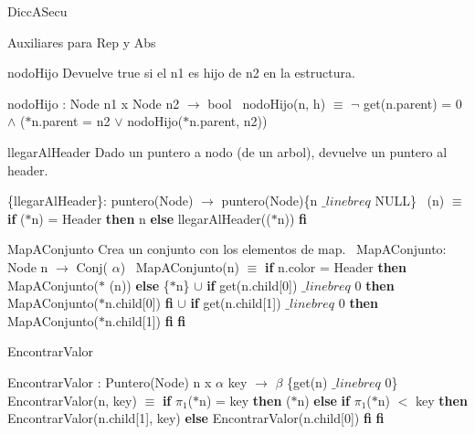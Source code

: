 \begin{DoxyParagraph}{\-Dicc\-A\-Secu}
\begin{DoxyVerb}Auxiliares para Rep y Abs
\end{DoxyVerb}


\begin{DoxyParagraph}{nodo\+Hijo}
Devuelve true si el n1 es hijo de n2 en la estructura.

nodo\+Hijo \+: Node n1 x Node n2 $\to$ bool~\newline
nodo\+Hijo(n, h) $\equiv$ $\lnot$ get(n.\+parent) = 0 $\land$ ($\ast$n.parent = n2 $\lor$ nodo\+Hijo($\ast$n.parent, n2)) 
\end{DoxyParagraph}


\begin{DoxyParagraph}{llegar\+Al\+Header}
Dado un puntero a nodo (de un arbol), devuelve un puntero al header.

\{llegar\+Al\+Header\}\+: puntero(\+Node) $\to$ puntero(\+Node)\{n $\_linebr eq$ N\+U\+LL\}~\newline
(n) $\equiv$ {\bfseries if} ($\ast$n) = Header {\bfseries then} n {\bfseries else} llegar\+Al\+Header(($\ast$n)) {\bfseries fi} 


\end{DoxyParagraph}
\begin{DoxyParagraph}{Map\+A\+Conjunto}
Crea un conjunto con los elementos de map.~\newline
 Map\+A\+Conjunto\+: Node n $\to$ Conj( $\alpha$)~\newline
Map\+A\+Conjunto(n) $\equiv$ {\bfseries if} n.\+color = Header {\bfseries then} Map\+A\+Conjunto($\ast$ (n)) {\bfseries else} \{$\ast$n\} $\cup$ {\bfseries if} get(n.\+child\mbox{[}0\mbox{]}) $\_linebr eq$ 0 {\bfseries then} Map\+A\+Conjunto($\ast$n.child\mbox{[}0\mbox{]}) {\bfseries fi} $\cup$ {\bfseries if} get(n.\+child\mbox{[}1\mbox{]}) $\_linebr eq$ 0 {\bfseries then} Map\+A\+Conjunto($\ast$n.child\mbox{[}1\mbox{]}) {\bfseries fi} {\bfseries fi} 
\end{DoxyParagraph}


\begin{DoxyParagraph}{Encontrar\+Valor}


Encontrar\+Valor \+: Puntero(\+Node) n x $\alpha$ key $\to$ $\beta$ \{get(n) $\_linebr eq$ 0\}~\newline
Encontrar\+Valor(n, key) $\equiv$ {\bfseries if} $\pi_1$($\ast$n) = key {\bfseries then} ($\ast$n) {\bfseries else} {\bfseries if} $\pi_1$($\ast$n) $<$ key {\bfseries then} Encontrar\+Valor(n.\+child\mbox{[}1\mbox{]}, key) {\bfseries else} Encontrar\+Valor(n.\+child\mbox{[}0\mbox{]}) {\bfseries fi} {\bfseries fi} 
\end{DoxyParagraph}


\end{DoxyParagraph}
